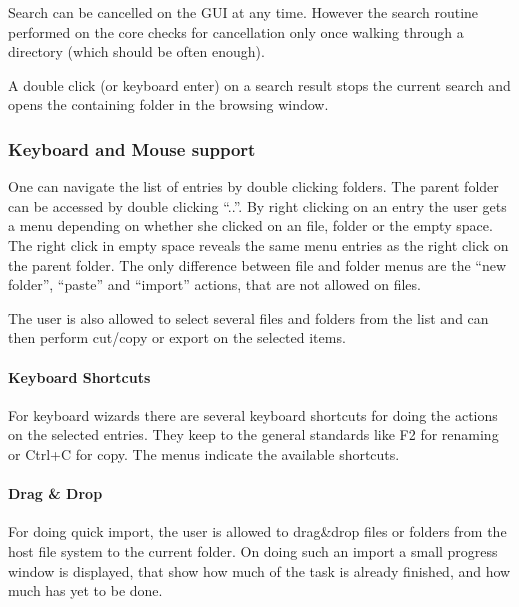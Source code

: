 Search can be cancelled on the GUI at any time. However the search routine performed on the core checks for cancellation only once walking through a directory (which should be often enough).

A double click (or keyboard enter) on a search result stops the current search and opens the containing folder in the browsing window.

\subsubsection{Keyboard and Mouse support}
One can navigate the list of entries by double clicking folders. The parent
folder can be accessed by double clicking ``..''. By right clicking on an entry
the user gets a menu depending on whether she clicked on an file, folder or the empty
space. The right click in empty space reveals the same menu entries as the right
click on the parent folder. The only difference between file and folder menus
are the ``new folder'', ``paste'' and ``import'' actions, that are not allowed
on files.

The user is also allowed to select several files and folders from the list and
can then perform cut/copy or export on the selected items. 


\paragraph{Keyboard Shortcuts}
For keyboard wizards there are several keyboard shortcuts for doing the actions
on the selected entries. They keep to the general standards like F2 for renaming
or Ctrl+C for copy. The menus indicate the available shortcuts.
\paragraph{Drag \& Drop}
For doing quick import, the user is allowed to drag\&drop files or folders from
the host file system to the current folder. On doing such an import a small
progress window is displayed, that show how much of the task is already
finished, and how much has yet to be done.
